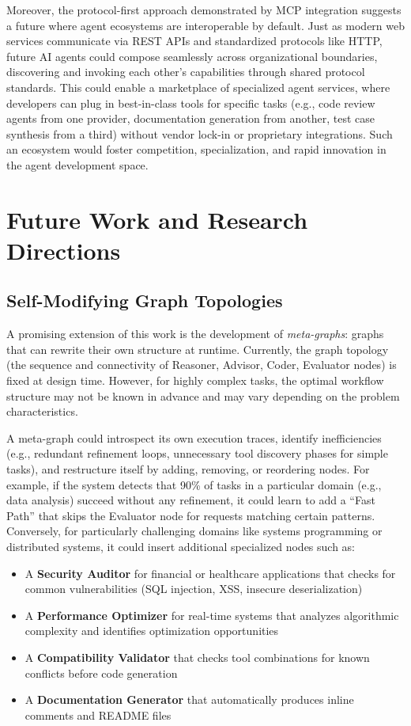 \documentclass[lettersize,journal]{IEEEtran}
\begin{document}
Moreover, the protocol-first approach demonstrated by MCP integration suggests a future where agent ecosystems are interoperable by default. Just as modern web services communicate via REST APIs and standardized protocols like HTTP, future AI agents could compose seamlessly across organizational boundaries, discovering and invoking each other's capabilities through shared protocol standards. This could enable a marketplace of specialized agent services, where developers can plug in best-in-class tools for specific tasks (e.g., code review agents from one provider, documentation generation from another, test case synthesis from a third) without vendor lock-in or proprietary integrations. Such an ecosystem would foster competition, specialization, and rapid innovation in the agent development space.



\section{Future Work and Research Directions}

\subsection{Self-Modifying Graph Topologies}
A promising extension of this work is the development of \textit{meta-graphs}: graphs that can rewrite their own structure at runtime. Currently, the graph topology (the sequence and connectivity of Reasoner, Advisor, Coder, Evaluator nodes) is fixed at design time. However, for highly complex tasks, the optimal workflow structure may not be known in advance and may vary depending on the problem characteristics.

A meta-graph could introspect its own execution traces, identify inefficiencies (e.g., redundant refinement loops, unnecessary tool discovery phases for simple tasks), and restructure itself by adding, removing, or reordering nodes. For example, if the system detects that 90\% of tasks in a particular domain (e.g., data analysis) succeed without any refinement, it could learn to add a ``Fast Path'' that skips the Evaluator node for requests matching certain patterns. Conversely, for particularly challenging domains like systems programming or distributed systems, it could insert additional specialized nodes such as:
\begin{itemize}
    \item A \textbf{Security Auditor} for financial or healthcare applications that checks for common vulnerabilities (SQL injection, XSS, insecure deserialization)
    \item A \textbf{Performance Optimizer} for real-time systems that analyzes algorithmic complexity and identifies optimization opportunities
    \item A \textbf{Compatibility Validator} that checks tool combinations for known conflicts before code generation
    \item A \textbf{Documentation Generator} that automatically produces inline comments and README files
\end{itemize}
\end{document}
